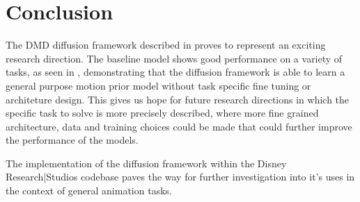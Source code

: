 \section{Conclusion}

The DMD diffusion framework described in  proves to represent an exciting research direction. The baseline model shows good performance on a variety of tasks, as seen in , demonstrating that the diffusion framework is able to learn a general purpose motion prior model without task specific fine tuning or architeture design. This gives us hope for future research directions in which the specific task to solve is more precisely described, where more fine grained architecture, data and training choices could be made that could further improve the performance of the models. 

The implementation of the diffusion framework within the Disney Research|Studios codebase paves the way for further investigation into it's uses in the context of general animation tasks.

